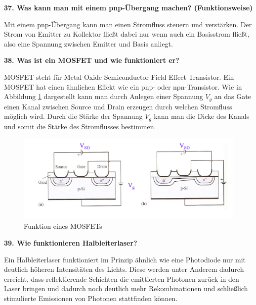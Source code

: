 \noindent\textbf{37. Was kann man mit einem pnp-Übergang machen? (Funktionsweise)}\\
\begin{addmargin}[25pt]{0pt}
Mit einem pnp-Übergang kann man einen Stromfluss steuern und verstärken. Der Strom von Emitter zu Kollektor fließt dabei nur wenn auch ein Basisstrom fließt, also eine Spannung zwischen Emitter und Basis anliegt.\\
\end{addmargin}

\noindent\textbf{38. Was ist ein MOSFET und wie funktioniert er?}\\
\begin{addmargin}[25pt]{0pt}
MOSFET steht für Metal-Oxide-Semiconductor Field Effect Transistor. Ein MOSFET hat einen ähnlichen Effekt wie ein pnp- oder npn-Transistor. Wie in Abbildung \ref{fig:MOSFET} dargestellt kann man durch Anlegen einer Spannung $V_g$ an das Gate einen Kanal zwischen Source und Drain erzeugen durch welchen Stromfluss möglich wird. Durch die Stärke der Spannung $V_g$ kann man die Dicke des Kanals und somit die Stärke des Stromflusses bestimmen.\\ 
\begin{figure}[h]
    \centering
    \includegraphics[width = \textwidth]{images/KM2/MOSFET.jpeg}
    \caption{Funktion eines MOSFETs}
    \label{fig:MOSFET}
\end{figure}
\end{addmargin}

\noindent\textbf{39. Wie funktionieren Halbleiterlaser?}\\
\begin{addmargin}[25pt]{0pt}
Ein Halbleiterlaser funktioniert im Prinzip ähnlich wie eine Photodiode nur mit deutlich höheren Intensitäten des Lichts. Diese werden unter Anderem dadurch erreicht, dass reflektierende Schichten die emittierten Photonen zurück in den Laser bringen und dadurch noch deutlich mehr Rekombinationen und schließlich stimulierte Emissionen von Photonen stattfinden können.\\
\end{addmargin}

